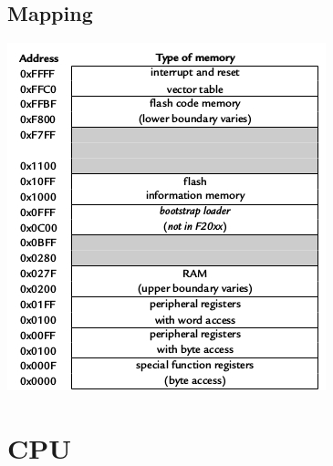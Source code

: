 \documentclass{beamer}
\begin{document}
\subsection{Mapping}
\begin{frame}
\includegraphics[scale=0.8,center]{MSP430_mem_big_dia.jpg}
\end{frame}
\section{CPU}
\end{document}
